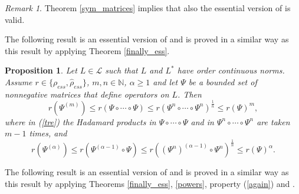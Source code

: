 \documentclass[12pt, reqno]{amsart}
\newtheorem{proposition}[theorem]{Proposition}
\theoremstyle{definition}
\theoremstyle{remark}
\newtheorem{remark}[theorem]{Remark}
\numberwithin{equation}{section}
\newcommand{\be}{\begin{equation}}
\newcommand{\ee}{\end{equation}}
\newcommand{\NN}{\mathbb{N}}
\begin{document}
\begin{remark}{\rm Theorem \ref{sym_matrices} implies  that also the essential version of \cite[Theorem 2.5(ii)]{BP21} is valid.
}
\end{remark}
The following result is an essential version of \cite[Theorem 3.1(ii)]{BP22b} and is proved in a similar way as this result by applying Theorem \ref{finally_ess}.  
\begin{proposition}
Let $L\in \mathcal{L}$ such that %
$L$ and $L^*$ have order continuous norms.  Assume  $r\in \{ \rho _{ess}, \hat{\rho} _{ess}\}$, $ m,n \in\NN$, $\alpha\ge 1$ and let $\Psi$ be %
 a  bounded set of nonnegative matrices that define operators on $L$. Then
\be
r(\Psi^{(m)})\le r(\Psi\circ\cdots\circ\Psi)\le r(\Psi ^n \circ\cdots\circ\Psi^n)^{\frac{1}{n}}\le r(\Psi)^{m},
\label{tre}
\ee
where in (\ref{tre}) the Hadamard products in $\Psi\circ\cdots\circ\Psi$ and in $\Psi ^n\circ\cdots\circ\Psi ^n$ are taken $m-1$ times, and
\be
r(\Psi^{(\alpha)})\le r(\Psi^{(\alpha-1)}\circ\Psi)\le  r((\Psi ^n)^{(\alpha-1)}\circ\Psi ^n)^{\frac{1}{n}} \le r(\Psi)^{\alpha}.
\label{tre1}
\ee
\end{proposition}
The following result is an essential version of \cite[Theorem 3.6]{BP22b} and is proved in a similar way as this result by applying Theorems \ref{finally_ess}, \ref{powers}, property (\ref{again}) and \cite[Theorem 3.4]{BP22b}.
\end{document}
